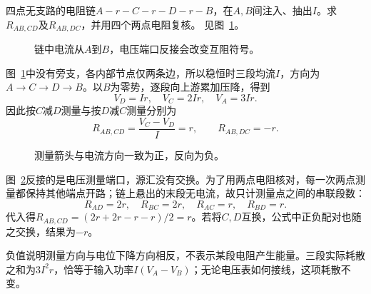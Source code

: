 \begin{exercise}[互阻的负号]\label{ex:c2-h3}
四点无支路的电阻链$A-r-C-r-D-r-B$，在$A,B$间注入、抽出$I$。求$R_{AB,CD}$及$R_{AB,DC}$，并用四个两点电阻复核。 见图~\ref{fig:c2-h3-q}。
\end{exercise}

\begin{figure}[H]\centering
{}
\caption{链中电流从$A$到$B$，电压端口反接会改变互阻符号。}\label{fig:c2-h3-q}
\end{figure}
\begin{solution}
图~\ref{fig:c2-h3-q}中没有旁支，各内部节点仅两条边，所以稳恒时三段均流$I$，方向为$A\to C\to D\to B$。以$B$为零势，逐段向上游累加压降，得到
\[
 V_D=Ir,\quad V_C=2Ir,\quad V_A=3Ir.
\]
因此按$C$减$D$测量与按$D$减$C$测量分别为
\[
 \boxed{R_{AB,CD}=\frac{V_C-V_D}I=r},\qquad
 \boxed{R_{AB,DC}=-r}.
\]
\begin{figure}[H]\centering
{}
\caption{测量箭头与电流方向一致为正，反向为负。}\label{fig:c2-h3-s}
\end{figure}
图~\ref{fig:c2-h3-s}反接的是电压测量端口，源汇没有交换。为了用两点电阻核对，每一次两点测量都保持其他端点开路；链上悬出的末段无电流，故只计测量点之间的串联段数：
\[
 R_{AD}=2r,\quad R_{BC}=2r,\quad R_{AC}=r,\quad R_{BD}=r.
\]
代入得$R_{AB,CD}=(2r+2r-r-r)/2=r$。若将$C,D$互换，公式中正负配对也随之交换，结果为$-r$。

负值说明测量方向与电位下降方向相反，不表示某段电阻产生能量。三段实际耗散之和为$3I^2r$，恰等于输入功率$I(V_A-V_B)$；无论电压表如何接线，这项耗散不变。
\end{solution}
